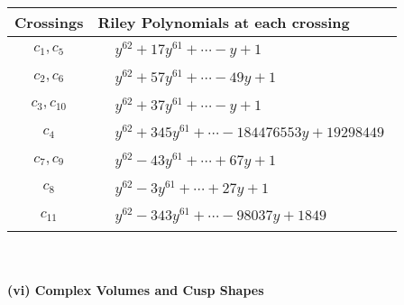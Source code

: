 \documentclass[1p]{elsarticle_modified}
\theoremstyle{definition}
\begin{document}
\begin{tabular}{m{50pt}|m{274pt}}
Crossings & \hspace{64pt}Riley Polynomials at each crossing \\
\hline $$\begin{aligned}c_{1},c_{5}\end{aligned}$$&$\begin{aligned}
&y^{62}+17 y^{61}+\cdots- y+1
\end{aligned}$\\
\hline $$\begin{aligned}c_{2},c_{6}\end{aligned}$$&$\begin{aligned}
&y^{62}+57 y^{61}+\cdots-49 y+1
\end{aligned}$\\
\hline $$\begin{aligned}c_{3},c_{10}\end{aligned}$$&$\begin{aligned}
&y^{62}+37 y^{61}+\cdots- y+1
\end{aligned}$\\
\hline $$\begin{aligned}c_{4}\end{aligned}$$&$\begin{aligned}
&y^{62}+345 y^{61}+\cdots-184476553 y+19298449
\end{aligned}$\\
\hline $$\begin{aligned}c_{7},c_{9}\end{aligned}$$&$\begin{aligned}
&y^{62}-43 y^{61}+\cdots+67 y+1
\end{aligned}$\\
\hline $$\begin{aligned}c_{8}\end{aligned}$$&$\begin{aligned}
&y^{62}-3 y^{61}+\cdots+27 y+1
\end{aligned}$\\
\hline $$\begin{aligned}c_{11}\end{aligned}$$&$\begin{aligned}
&y^{62}-343 y^{61}+\cdots-98037 y+1849
\end{aligned}$\\
\hline
\end{tabular}\\~\\
\newpage\flushleft \textbf{(vi) Complex Volumes and Cusp Shapes}
\end{document}
